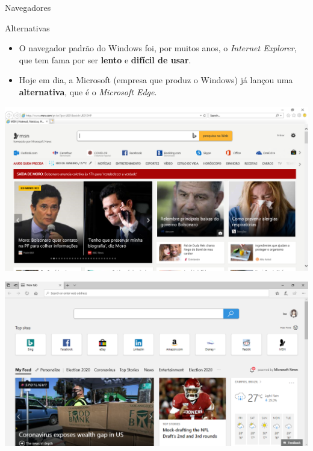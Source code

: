 \begin{frame}{Navegadores}
	\begin{block}{Alternativas}
		\begin{itemize}
			\item O navegador padrão do Windows foi, por muitos anos, o \textit{Internet Explorer}, que tem fama por ser \textbf{lento} e \textbf{difícil de usar}.
			\item Hoje em dia, a Microsoft (empresa que produz o Windows) já lançou uma \textbf{alternativa}, que é o \textit{Microsoft Edge}.
		\end{itemize}
	\end{block}
	
	\bigskip
	
	\begin{minipage}{0.49\linewidth}
		\centering
		\includegraphics[width=1\linewidth]{Figuras/Ch03/fig8.1}
	\end{minipage}\hfill
	\begin{minipage}{0.49\linewidth}
		\centering
		\includegraphics[width=1\linewidth]{Figuras/Ch03/fig8.3}
	\end{minipage}
\end{frame}


